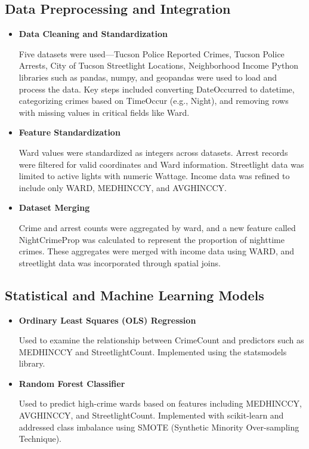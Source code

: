 \documentclass{report}
\begin{document}
\subsection{Data Preprocessing and Integration}

\begin{itemize}
\item \textbf{Data Cleaning and Standardization}
  \par Five datasets were used—Tucson Police Reported Crimes, Tucson Police Arrests, City of Tucson Streetlight Locations, Neighborhood Income Python libraries such as pandas, numpy, and geopandas were used to load and process the data. Key steps included converting DateOccurred to datetime, categorizing crimes based on TimeOccur (e.g., Night), and removing rows with missing values in critical fields like Ward.
  
\item \textbf{Feature Standardization}
  \par Ward values were standardized as integers across datasets. Arrest records were filtered for valid coordinates and Ward information. Streetlight data was limited to active lights with numeric Wattage. Income data was refined to include only WARD, MEDHINC\textunderscore CY, and AVGHINC\textunderscore CY.
  
\item \textbf{Dataset Merging}
  \par Crime and arrest counts were aggregated by ward, and a new feature called Night\textunderscore Crime\textunderscore Prop was calculated to represent the proportion of nighttime crimes. These aggregates were merged with income data using WARD, and streetlight data was incorporated through spatial joins.
\end{itemize}

\subsection{Statistical and Machine Learning Models}

\begin{itemize}
\item \textbf{Ordinary Least Squares (OLS) Regression}
  \par Used to examine the relationship between Crime\textunderscore Count and predictors such as MEDHINC\textunderscore CY and Streetlight\textunderscore Count. Implemented using the statsmodels library.
  
\item \textbf{Random Forest Classifier}
  \par Used to predict high-crime wards based on features including MEDHINC\textunderscore CY, AVGHINC\textunderscore CY, and Streetlight\textunderscore Count. Implemented with scikit-learn and addressed class imbalance using SMOTE (Synthetic Minority Over-sampling Technique).
\end{itemize}
\end{document}

